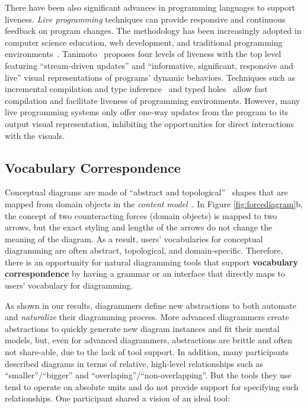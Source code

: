 There have been also significant advances in programming languages to support liveness. \emph{Live programming} techniques can provide responsive and continuous feedback on program changes. The methodology has been increasingly adopted in computer science education, web development, and traditional programming environments~\cite{mcdirmid_living_2007, wysiwyc, SEEDE}. Tanimoto~\cite{Viva-Liveness} proposes four levels of liveness with the top level featuring ``stream-driven updates'' and ``informative, significant, responsive and live'' visual representations of programs' dynamic behaviors. Techniques such as incremental compilation and type inference~\cite{mcdirmid_superglue_2006} and typed holes~\cite{typedHoles} allow fast compilation and facilitate liveness of programming environments. However, many live programming systems only offer one-way updates from the program to its output visual representation, inhibiting the opportunities for direct interactions with the visuals.

\subsection{Vocabulary Correspondence}

Conceptual diagrams are made of ``abstract and topological''~\cite{designingWithDiagrams} shapes that are mapped from domain objects in the \emph{content model}~\cite{fundamentalDesignVars}. In Figure \ref{fig:forcediagram}b, the concept of two counteracting forces (domain objects) is mapped to two arrows, but the exact styling and lengths of the arrows do not change the meaning of the diagram. As a result, users' vocabularies for conceptual diagramming are often abstract, topological, and domain-specific. Therefore, there is an opportunity for natural diagramming tools that support \textbf{vocabulary correspondence} by having a grammar or an interface that directly maps to users' vocabulary for diagramming. 

As shown in our results, diagrammers define new abstractions to both automate and \emph{naturalize} their diagramming process. More advanced diagrammers create abstractions to quickly generate new diagram instances and fit their mental models, but, even for advanced diagrammers, abstractions are brittle and often not share-able, due to the lack of tool support. In addition, many participants described diagrams in terms of relative, high-level relationships such as ``smaller''/``bigger'' and ``overlaping''/``non-overlapping''. But the tools they use tend to operate on absolute units and do not provide support for specifying such relationships. One participant shared a vision of an ideal tool:

